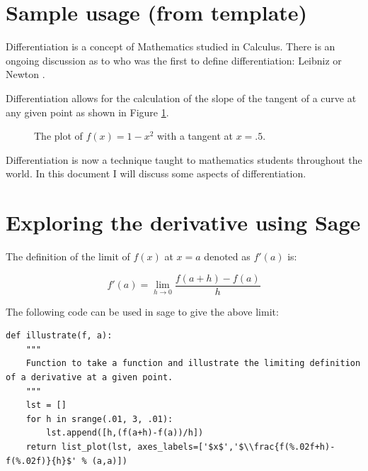 \documentclass[a4paper]{article}
\theoremstyle{break}
\begin{document}
\pagebreak
\section{Sample usage (from template)}

Differentiation is a concept of Mathematics studied in Calculus. There is an ongoing discussion as to who was the first to define differentiation: Leibniz or Newton \cite{bardi2006calculus}.

Differentiation allows for the calculation of the slope of the tangent of a curve at any given point as shown in Figure \ref{exampleplot}.

\begin{figure}[!htbp]
\begin{center}
\end{center}
\caption{The plot of $f(x)=1-x^2$ with a tangent at $x=.5$.}\label{exampleplot}
\end{figure}

Differentiation is now a technique taught to mathematics students throughout the world. In this document I will discuss some aspects of differentiation.

\section{Exploring the derivative using Sage}

The definition of the limit of $f(x)$ at $x=a$ denoted as $f'(a)$ is:

\begin{equation}
f'(a) = \lim_{h\to0}\frac{f(a+h)-f(a)}{h}
\end{equation}

The following code can be used in sage to give the above limit:

\begin{verbatim}
def illustrate(f, a):
    """
    Function to take a function and illustrate the limiting definition of a derivative at a given point.
    """
    lst = []
    for h in srange(.01, 3, .01):
    	lst.append([h,(f(a+h)-f(a))/h])
    return list_plot(lst, axes_labels=['$x$','$\\frac{f(%.02f+h)-f(%.02f)}{h}$' % (a,a)])
\end{verbatim}
\end{document}
